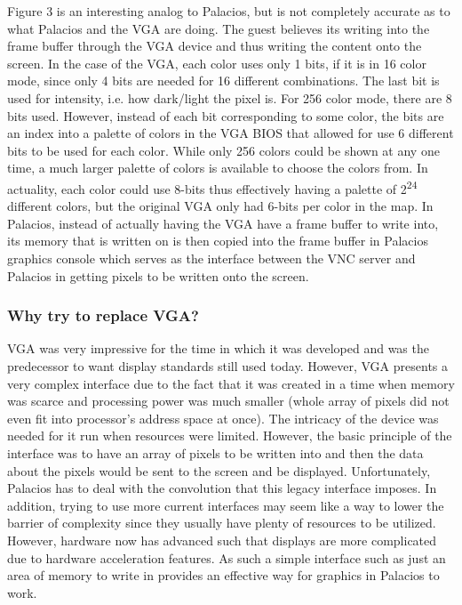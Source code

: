 \documentclass{acm_proc_article-sp}
\begin{document}
 \par
 Figure 3 is an interesting analog to Palacios, but is not completely accurate as to what Palacios and the VGA are doing. The guest believes its writing into the frame buffer through the VGA device and thus writing the content onto the screen. In the case of the VGA, each color uses only 1 bits, if it is in 16 color mode, since only 4 bits are needed for 16 different combinations. The last bit is used for intensity, i.e. how dark/light the pixel is.\cite{ibmvga} For 256 color mode, there are 8 bits used. However, instead of each bit corresponding to some color, the bits are an index into a palette of colors  in the VGA BIOS that allowed for use 6 different bits to be used for each color.\cite{ibmvga} While only 256 colors could be shown at any one time, a much larger palette of colors is available to choose the colors from. In actuality, each color could use 8-bits thus effectively having a palette of 2\textsuperscript{24} different colors, but the original VGA only had 6-bits per color in the map. In Palacios, instead of actually having the VGA have a frame buffer to write into, its memory that is written on is then copied into the frame buffer in Palacios graphics console which serves as the interface between the VNC server and Palacios in getting pixels to be written onto the screen. 
 
 \subsubsection{Why try to replace VGA?}
 VGA was very impressive for the time in which it was developed and was the predecessor to want display standards still used today. However, VGA presents a very complex interface due to the fact that it was created in a time when memory was scarce and processing power was much smaller (whole array of pixels did not even fit into processor's address space at once). The intricacy of the device was needed for it run when resources were limited. However, the basic principle of the interface was to have an array of pixels to be written into and then the data about the pixels would be sent to the screen and be displayed. Unfortunately, Palacios has to deal with the convolution that this legacy interface imposes. In addition, trying to use more current interfaces may seem like a way to lower the barrier of complexity since they usually have plenty of resources to be utilized. However, hardware now has advanced such that displays are more complicated due to hardware acceleration features. As such a simple interface such as just an area of memory to write in provides an effective way for graphics in Palacios to work.
 
\end{document}
